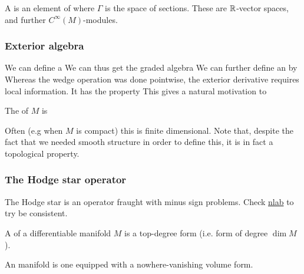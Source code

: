 \documentclass{article}
\begin{document}
\begin{definition}
A  is an element of 
where $\Gamma$ is the space of sections. These are $\mathbb{R}$-vector spaces, and further $C^\infty(M)$-modules. 
\end{definition}

\subsubsection{Exterior algebra}
We can define a  
We can thus get the graded algebra 
We can further define an  by 
Whereas the wedge operation was done pointwise, the exterior derivative requires local information. It has the property
This gives a natural motivation to 
\begin{definition}
The  of $M$ is 
\end{definition}
Often (e.g when $M$ is compact) this is finite dimensional. Note that, despite the fact that we needed smooth structure in order to define this, it is in fact a topological property. 

\subsubsection{The Hodge star operator}
The Hodge star is an operator fraught with minus sign problems. Check \href{https://ncatlab.org/nlab/show/Hodge+star+operator}{nlab} to try be consistent. 

\begin{definition}
	A  of a differentiable manifold $M$ is a top-degree form (i.e. form of degree $\dim M$). 
\end{definition}

\begin{definition}
	An  manifold is one equipped with a nowhere-vanishing volume form. 
\end{definition}
\end{document}
